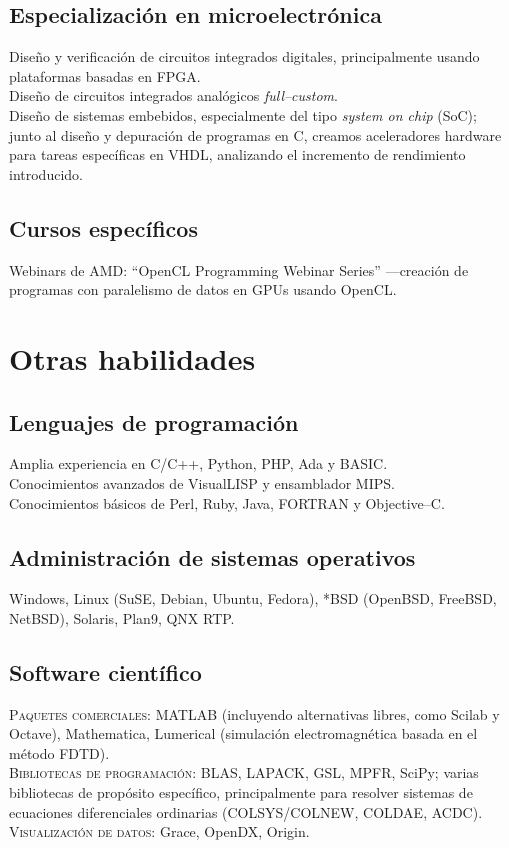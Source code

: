 \documentclass[11pt, a4paper]{article}
\newcommand{\years}[1]{\marginnote{\scriptsize #1}}
\begin{document}
\subsection*{Especialización en microelectrónica}
\noindent
\years{2008-2010}Diseño y verificación de circuitos integrados digitales, principalmente usando plataformas basadas en FPGA.\\
Diseño de circuitos integrados analógicos \emph{full--custom}.\\
Diseño de sistemas embebidos, especialmente del tipo \emph{system on chip} (SoC); junto al diseño y depuración de programas en C, creamos aceleradores hardware para tareas específicas en VHDL, analizando el incremento de rendimiento introducido.

\subsection*{Cursos específicos}
\noindent
\years{2010}Webinars de AMD: ``OpenCL Programming Webinar Series'' ---creación de programas con paralelismo de datos en GPUs usando OpenCL.


\section*{Otras habilidades} %
\subsection*{Lenguajes de programación}
\noindent
	Amplia experiencia en C/C++, Python, PHP, Ada y BASIC.\\
	Conocimientos avanzados de VisualLISP y ensamblador MIPS.\\
	Conocimientos básicos de Perl, Ruby, Java, FORTRAN y Objective--C.
\subsection*{Administración de sistemas operativos}
\noindent
	Windows, Linux (SuSE, Debian, Ubuntu, Fedora), *BSD (OpenBSD, FreeBSD, NetBSD), Solaris, Plan9, QNX RTP.
\subsection*{Software científico}
\noindent
	\textsc{Paquetes comerciales}: MATLAB (incluyendo alternativas libres, como Scilab y Octave), Mathematica, Lumerical (simulación electromagnética basada en el método FDTD).\\
	\textsc{Bibliotecas de programación}: BLAS, LAPACK, GSL, MPFR, SciPy; varias bibliotecas de propósito específico, principalmente para resolver sistemas de ecuaciones diferenciales ordinarias (COLSYS/COLNEW, COLDAE, ACDC).\\
	\textsc{Visualización de datos}: Grace, OpenDX, Origin.
\end{document}
